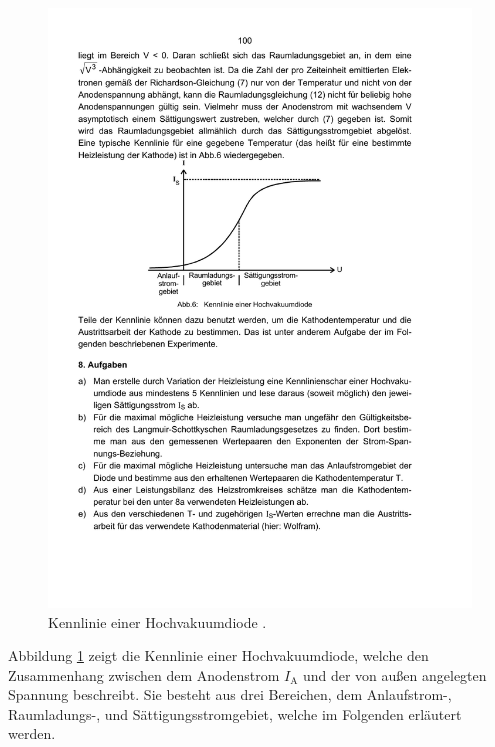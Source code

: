 \begin{figure}
  \centering
  \includegraphics[scale=0.8]{content/kennlinie.pdf}
\caption{Kennlinie einer Hochvakuumdiode \cite{anleitung504}.}
  \label{fig:kennlinie}
\end{figure}

Abbildung \ref{fig:kennlinie} zeigt die Kennlinie einer Hochvakuumdiode, welche den Zusammenhang zwischen dem Anodenstrom $I_\mathrm{A}$ und der von außen angelegten Spannung beschreibt. Sie besteht aus drei Bereichen, dem Anlaufstrom-, Raumladungs-, und Sättigungsstromgebiet, welche im Folgenden erläutert werden.

